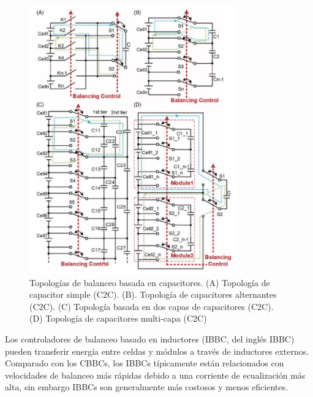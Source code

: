 \documentclass[10pt,a4paper]{article}
\newcounter{subsubsubsection}[subsubsection]
\begin{document}
\begin{figure}[h!]
    \begin{center}
        \includegraphics[width=0.8\textwidth]{cbbc_top.png}
        \caption{Topolog\'ias de balanceo basada en capacitores. (A) Topolog\'ia
        de capacitor simple (\acrshort{C2C}). (B). Topolog\'ia de capacitores
        alternantes (\acrshort{C2C}). (C) Topolog\'ia basada en dos capas de
        capacitores (\acrshort{C2C}). (D) Topolog\'ia de capacitores multi-capa
        (\acrshort{C2C})}
        \label{cbbc_top}
    \end{center}
\end{figure}

\newpage


Los controladores de balanceo basado en inductores (\acrshort{IBBC}, del
ingl\'es \acrlong{IBBC}) pueden transferir energ\'ia entre celdas y m\'odulos a
trav\'es de inductores externos. Comparado con los \acrshort{CBBC}s, los
\acrshort{IBBC}s t\'ipicamente est\'an relacionados con velocidades de balanceo
m\'as r\'apidas debido a una corriente de ecualizaci\'on m\'as alta, sin embargo
\acrshort{IBBC}s son generalmente m\'as costosos y menos eficientes.
\end{document}
